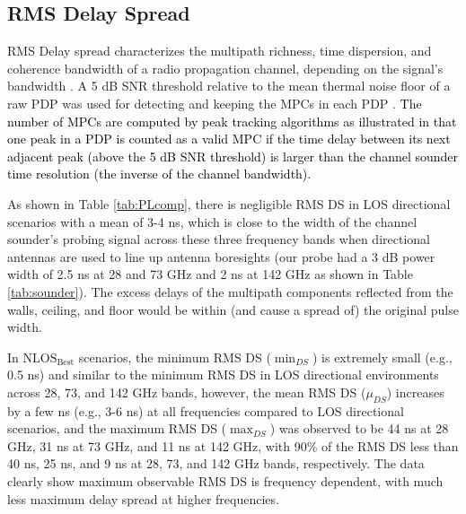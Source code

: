 \documentclass[conference]{IEEEtran}
\begin{document}
\subsection{RMS Delay Spread} \label{sec:DS}
RMS Delay spread characterizes the multipath richness, time dispersion, and coherence bandwidth of a radio propagation channel, depending on the signal's bandwidth \cite{Rap02a,Rap15a}. A 5 dB SNR threshold relative to the mean thermal noise floor of a raw PDP was used for detecting and keeping the MPCs in each PDP \cite{rappaport2015wideband}. \textcolor{black}{The number of MPCs are computed by peak tracking algorithms as illustrated in \cite{Ju20a} that one peak in a PDP is counted as a valid MPC if the time delay between its next adjacent peak (above the 5 dB SNR threshold) is larger than the channel sounder time resolution (the inverse of the channel bandwidth).} 


As shown in Table \ref{tab:PLcomp}, there is negligible RMS DS in LOS directional scenarios with a mean of 3-4 ns, which is close to the width of the channel sounder's probing signal across these three frequency bands when directional antennas are used to line up antenna boresights (our probe had a 3 dB power width of 2.5 ns at 28 and 73 GHz and 2 ns at 142 GHz as shown in Table \ref{tab:sounder}). The excess delays of the multipath components reflected from the walls, ceiling, and floor would be within (and cause a spread of) the original pulse width.


In $\text{NLOS}_{\text{Best}}$ scenarios, the minimum RMS DS ($\min_{DS}$) is extremely small (e.g., 0.5 ns) and similar to the minimum RMS DS in LOS directional environments across 28, 73, and 142 GHz bands, however, the mean RMS DS ($\mu_{DS}$) increases by a few ns (e.g., 3-6 ns) at all frequencies compared to LOS directional scenarios, and the maximum RMS DS ($\max_{DS}$) was observed to be 44 ns at 28 GHz, 31 ns at 73 GHz, and 11 ns at 142 GHz, with 90\% of the RMS DS less than 40 ns, 25 ns, and 9 ns at 28, 73, and 142 GHz bands, respectively. The data clearly show maximum observable RMS DS is frequency dependent, with much less maximum delay spread at higher frequencies.
\end{document}
